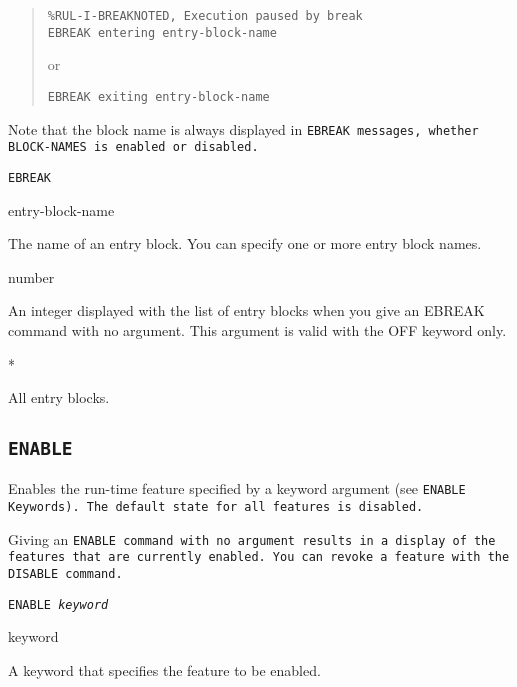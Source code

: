 \begin{quote}
\begin{verbatim}
%RUL-I-BREAKNOTED, Execution paused by break
EBREAK entering entry-block-name
\end{verbatim}
or
\begin{verbatim}
EBREAK exiting entry-block-name
\end{verbatim}
\end{quote}

Note that the block name is always displayed in \tt{EBREAK} messages,
whether \tt{BLOCK-NAMES} is enabled or disabled.

\Format

\tt{EBREAK}

\begin{arguments}
\item[entry-block-name] 

  The name of an entry block. You can specify one or more entry block
  names.

\item[number]

  An integer displayed with the list of entry blocks when you give an
  EBREAK command with no argument. This argument is valid with the OFF
  keyword only.

\item[*] 

  All entry blocks.
\end{arguments}

\subsection{\tt{ENABLE}}

Enables the run-time feature specified by a keyword argument (see
\tt{ENABLE} Keywords). The default state for all features is disabled.

Giving an \tt{ENABLE} command with no argument results in a display of
the features that are currently enabled. You can revoke a feature with
the \tt{DISABLE} command.

\Format

\tt{ENABLE} \it{keyword}

\begin{arguments}

\item[keyword]

  A keyword that specifies the feature to be enabled.
\end{arguments}


